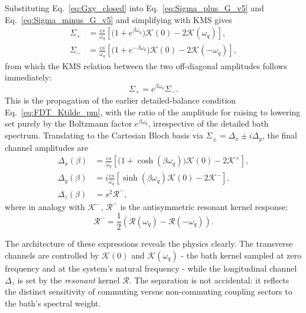 Substituting Eq.~\eqref{eq:Gxy_closed} into Eq.~\eqref{eq:Sigma_plus_G_v5} and Eq.~\eqref{eq:Sigma_minus_G_v5}
and simplifying with KMS gives
\begin{align}
    \Sigma_+ &= \frac{cs}{\omega_q}\!\left[\big(1+e^{\beta\omega_q}\big)\mathcal{K}(0)-2\mathcal{K}(\omega_q)\right], \label{eq:Sigma_plus_K_v5}\\
    \Sigma_- &= \frac{cs}{\omega_q}\!\left[\big(1+e^{-\beta\omega_q}\big)\mathcal{K}(0)-2\mathcal{K}(-\omega_q)\right], \label{eq:Sigma_minus_K_v5}
\end{align}
from which the KMS relation between the two off-diagonal amplitudes follows
immediately:
\begin{equation}
    \Sigma_+ = e^{\beta\omega_q}\Sigma_-.
    \label{eq:Sigma_pm_kms_relation_v5}
\end{equation}
This is the propagation of the earlier detailed-balance condition
Eq.~\eqref{eq:FDT_Ktilde_pm}, with the ratio of the amplitude for raising to lowering
 set purely by the Boltzmann factor $e^{\beta\omega_q}$, irrespective of the
detailed bath spectrum. Translating to the Cartesian Bloch basis via
$\Sigma_\pm=\Delta_x\pm i\Delta_y$, the final channel amplitudes are
\begin{align}
    \Delta_x(\beta)
    &= \frac{cs}{\omega_q}\!\left[\big(1+\cosh(\beta\omega_q)\big)\mathcal{K}(0)-2\mathcal{K}^+\right],
    \label{eq:Deltax_final}\\
    \Delta_y(\beta)
    &= i\frac{cs}{\omega_q}\!\left[\sinh(\beta\omega_q)\mathcal{K}(0)-2\mathcal{K}^-\right],
    \label{eq:Deltay_final}\\
    \Delta_z(\beta)
    &= s^2\mathcal{R}^-,
    \label{eq:Deltaz_final}
\end{align}
where in analogy with $\mathcal{K}^-$, $\mathcal{R}^-$ is the antisymmetric resonant kernel response:
\begin{equation}
\mathcal{R}^-=\frac{1}{2}(\mathcal{R}(\omega_q)-\mathcal{R}(-\omega_q)).
\end{equation} 


The architecture of these expressions reveals the physics clearly.  The
transverse channels are controlled by $\mathcal{K}(0)$
and $\mathcal{K}(\omega_q)$ - the bath kernel sampled at zero frequency and
at the system's natural frequency - while the longitudinal channel $\Delta_z$ is
set by the \emph{resonant} kernel $\mathcal{R}$.  The separation is not
accidental: it reflects the distinct sensitivity of commuting versus
non-commuting coupling sectors to the bath's spectral weight.


